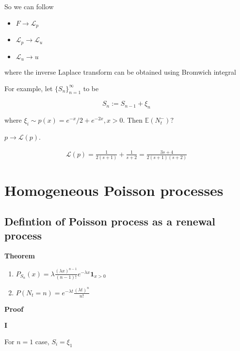 \documentclass[12pt]{article}
\theoremstyle{nonumberbreak}
\begin{document}
So we can follow 

\begin{itemize}
	\item $F \to \mathcal{L}_p$
	\item $\mathcal{L}_p \to \mathcal{L}_u$
	\item $\mathcal{L}_u \to u$
\end{itemize}

where the inverse Laplace transform can be obtained using Bromwich integral



For example, let $\{S_n \}_{n=1}^\infty$ to be

$$
S_n := S_{n-1} + \xi_n
$$

where $\xi_i \sim p(x) = e^{-x}/2 + e^{-2x}, x>0$. Then $\mathbb{E} (N_t^{-})?$


\textbf{$p \to \mathcal{L}(p)$}. 

$$
\begin{aligned}
\mathcal{L}(p) = \frac{1}{2(s+1)} + \frac{1}{s+2} = \frac{3s + 4}{2(s+1)(s+2)}  
\end{aligned}
$$




\pagebreak
\section{Homogeneous Poisson processes}


\subsection{Defintion of Poisson process as a renewal process}


\begin{theorem}
\textbf{Theorem}
\begin{enumerate}[label=(\roman*)]
	\item $P_{S_n} (x) = \lambda \frac{(\lambda x)^{n-1}}{(n-1)!} e^{-\lambda x} \mathbf{1}_{x>0}$
	\item $P(N_t = n) = e^{-\lambda t} \frac{(\lambda t)^n}{n!}$
\end{enumerate}
\end{theorem}

\textbf{Proof} 

\textbf{I}

For $n=1$ case, $S_i = \xi_1$
\end{document}
